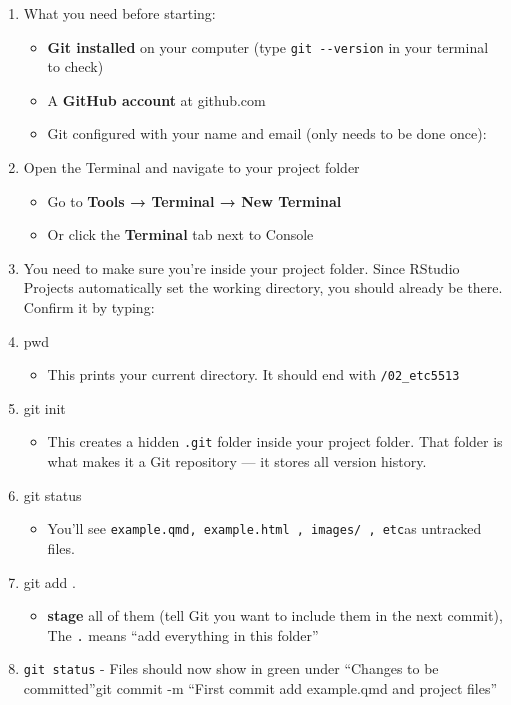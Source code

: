 \documentclass[
  letterpaper,
  DIV=11,
  numbers=noendperiod]{scrartcl}
\providecommand{\tightlist}{%
  \setlength{\itemsep}{0pt}\setlength{\parskip}{0pt}}
\begin{document}
\begin{enumerate}
\def\labelenumi{\arabic{enumi}.}
\item
  What you need before starting:

  \begin{itemize}
  \item
    \textbf{Git installed} on your computer (type
    \texttt{git\ -\/-version} in your terminal to check)
  \item
    A \textbf{GitHub account} at github.com
  \item
    Git configured with your name and email (only needs to be done
    once):
  \end{itemize}
\item
  Open the Terminal and navigate to your project folder

  \begin{itemize}
  \item
    Go to \textbf{Tools → Terminal → New Terminal}
  \item
    Or click the \textbf{Terminal} tab next to Console
  \end{itemize}
\item
  You need to make sure you're inside your project folder. Since RStudio
  Projects automatically set the working directory, you should already
  be there. Confirm it by typing:
\item
  pwd

  \begin{itemize}
  \tightlist
  \item
    This prints your current directory. It should end with
    \texttt{/02\_etc5513}
  \end{itemize}
\item
  git init

  \begin{itemize}
  \tightlist
  \item
    This creates a hidden \texttt{.git} folder inside your project
    folder. That folder is what makes it a Git repository --- it stores
    all version history.
  \end{itemize}
\item
  git status

  \begin{itemize}
  \tightlist
  \item
    You'll see \texttt{example.qmd,\ example.html\ ,\ images/\ ,\ etc}as
    untracked files.
  \end{itemize}
\item
  git add .

  \begin{itemize}
  \tightlist
  \item
    \textbf{stage} all of them (tell Git you want to include them in the
    next commit), The \texttt{.} means ``add everything in this folder''
  \end{itemize}
\item
  \texttt{git\ status} - Files should now show in green under ``Changes
  to be committed''git commit -m ``First commit add example.qmd and
  project files''
\end{enumerate}
\end{document}
